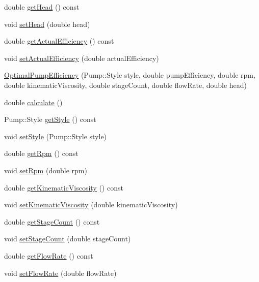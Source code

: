 \begin{DoxyCompactItemize}
double \hyperlink{class_optimal_pump_efficiency_af31fdb10aabc197ff7536c9bbe006573}{get\+Head} () const
\item 
void \hyperlink{class_optimal_pump_efficiency_ac317c900ec68797cf051977147ea33da}{set\+Head} (double head)
\item 
double \hyperlink{class_optimal_pump_efficiency_aa2ac8a7c61bc28f82e30cb44b9c21008}{get\+Actual\+Efficiency} () const
\item 
void \hyperlink{class_optimal_pump_efficiency_a539b20c53c7ba6a5983a60d74be4ac9e}{set\+Actual\+Efficiency} (double actual\+Efficiency)
\item 
\hyperlink{class_optimal_pump_efficiency_a5bc186f1a2bc5457a13d8d5aa4626d08}{Optimal\+Pump\+Efficiency} (Pump\+::\+Style style, double pump\+Efficiency, double rpm, double kinematic\+Viscosity, double stage\+Count, double flow\+Rate, double head)
\item 
double \hyperlink{class_optimal_pump_efficiency_ac40720d1fcdf40d8b364df37e58e7f4d}{calculate} ()
\item 
Pump\+::\+Style \hyperlink{class_optimal_pump_efficiency_a601fe15e9acc23112743fabe417030fb}{get\+Style} () const
\item 
void \hyperlink{class_optimal_pump_efficiency_ab6b85c8c08d6641c5375c65436f16a2f}{set\+Style} (Pump\+::\+Style style)
\item 
double \hyperlink{class_optimal_pump_efficiency_a58e8a430ced612e0518abd07fb30b085}{get\+Rpm} () const
\item 
void \hyperlink{class_optimal_pump_efficiency_afc6b6f46b4e289efc8819249ad1c9fb5}{set\+Rpm} (double rpm)
\item 
double \hyperlink{class_optimal_pump_efficiency_a8c2f7fcacce2b42ed83f29aec2d4671e}{get\+Kinematic\+Viscosity} () const
\item 
void \hyperlink{class_optimal_pump_efficiency_a00017e0bd100beb2f4b0bf2db5e3687f}{set\+Kinematic\+Viscosity} (double kinematic\+Viscosity)
\item 
double \hyperlink{class_optimal_pump_efficiency_aac0c1a4a6492bf00b245c2a61d100eaa}{get\+Stage\+Count} () const
\item 
void \hyperlink{class_optimal_pump_efficiency_a5b0b2a24a87c1c8fc92aa96c6ba4b727}{set\+Stage\+Count} (double stage\+Count)
\item 
double \hyperlink{class_optimal_pump_efficiency_a77c6618681b0fd3a0fc02dc49d16ee99}{get\+Flow\+Rate} () const
\item 
void \hyperlink{class_optimal_pump_efficiency_a90067b57c559fd3274fb8d6e00f6221d}{set\+Flow\+Rate} (double flow\+Rate)

\end{DoxyCompactItemize}
